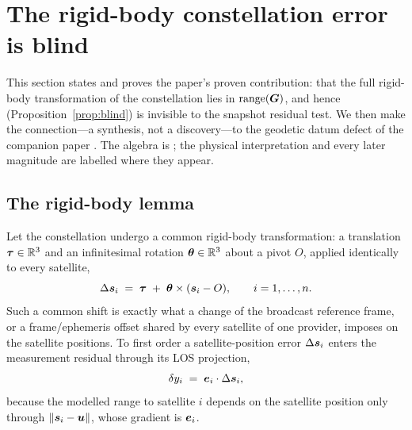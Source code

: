 \section{The rigid-body constellation error is blind}
\label{sec:theorem}

This section states and proves the paper's proven contribution: that the full
rigid-body transformation of the constellation lies in $\operatorname{range}(\bm{G})$, and hence
(Proposition~\ref{prop:blind}) is invisible to the snapshot residual test. We then make
the connection---a synthesis, not a discovery---to the geodetic datum defect of the
companion paper \citep{baweja2026datum}. The algebra is \Proven{}; the physical
interpretation and every later magnitude are labelled where they appear.

\subsection{The rigid-body lemma}
\label{sec:rigidlemma}

Let the constellation undergo a common rigid-body transformation: a translation
$\bm\tau\in\mathbb{R}^3$ and an infinitesimal rotation $\bm\theta\in\mathbb{R}^3$ about a pivot $O$,
applied identically to every satellite,
\begin{equation}
  \Delta\bm{s}_i \;=\; \bm\tau \;+\; \bm\theta\times(\bm{s}_i-O),
  \qquad i=1,\dots,n .
  \label{eq:rigid}
\end{equation}
Such a common shift is exactly what a change of the broadcast reference frame, or a
frame/ephemeris offset shared by every satellite of one provider, imposes on the
satellite positions. To first order a satellite-position error $\Delta\bm{s}_i$ enters the
measurement residual through its LOS projection,
\begin{equation}
  \delta y_i \;=\; \bm{e}_i\cdot\Delta\bm{s}_i,
  \label{eq:losproj}
\end{equation}
because the modelled range to satellite $i$ depends on the satellite position only
through $\|\bm{s}_i-\bm{u}\|$, whose gradient is $\bm{e}_i$.


